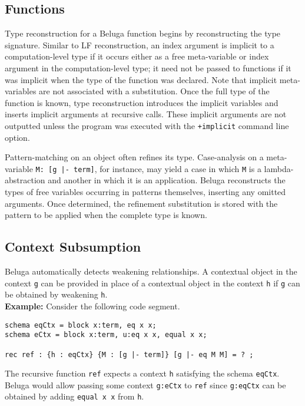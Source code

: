 \documentclass[11pt]{article}
\begin{document}
\subsection{Functions}
Type reconstruction for a Beluga function begins by reconstructing the type signature. Similar to LF reconstruction, an index argument is implicit to a computation-level type if it occurs either as a free meta-variable or index argument in the computation-level type; it need not be passed to functions if it was implicit when the type of the function was declared. Note that implicit meta-variables are not associated with a substitution. Once the full type of the function is known, type reconstruction introduces the implicit variables and inserts implicit arguments at recursive calls. These implicit arguments are not outputted unless the program was executed with the \texttt{+implicit} command line option.
 
Pattern-matching on an object often refines its type. Case-analysis on a meta-variable \texttt{M: [g |- term]}, for instance, may yield a case in which \texttt{M} is a lambda-abstraction and another in which it is an application. Beluga reconstructs the types of free variables occurring in patterns themselves, inserting any omitted arguments. Once determined, the refinement substitution is stored with the pattern to be applied when the complete type is known.

\subsection{Context Subsumption}
Beluga automatically detects weakening relationships. A contextual object in the context \texttt{g} can be provided in place of a contextual object in the context \texttt{h} if \texttt{g} can be obtained by weakening \texttt{h}. \\

\textbf{Example:} Consider the following code segment.
\begin{verbatim}
schema eqCtx = block x:term, eq x x;
schema eCtx = block x:term, u:eq x x, equal x x;

rec ref : {h : eqCtx} {M : [g |- term]} [g |- eq M M] = ? ;
\end{verbatim}
The recursive function \texttt{ref} expects a context \texttt{h} satisfying the schema \texttt{eqCtx}. Beluga would allow passing some context \texttt{g:eCtx} to \texttt{ref} since \texttt{g:eqCtx} can be obtained by adding \texttt{equal x x} from \texttt{h}.
\end{document}
